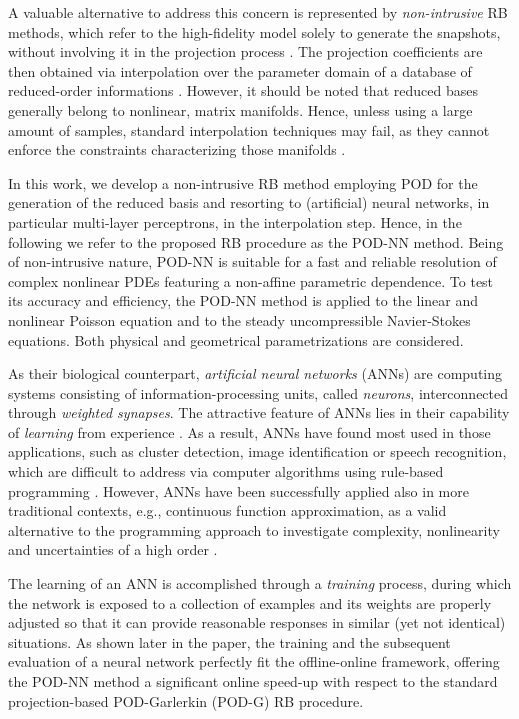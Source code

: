 \documentclass{elsarticle}
\theoremstyle{theorem}
\theoremstyle{definition}
\theoremstyle{remark}
\theoremstyle{proposition}
\numberwithin{figure}{section}
\begin{document}
		A valuable alternative to address this concern is represented by \emph{non-intrusive} RB methods, which refer to the high-fidelity model solely to generate the snapshots, without involving it in the projection process \cite{Chen17}. The projection coefficients are then obtained via interpolation over the parameter domain of a database of reduced-order informations \cite{Cas15}. However, it should be noted that reduced bases generally belong to nonlinear, matrix manifolds. Hence, unless using a large amount of samples, standard interpolation techniques may fail, as they cannot enforce the constraints characterizing those manifolds \cite{Ams10, BNR00}. 
		
		In this work, we develop a non-intrusive RB method employing POD for the generation of the reduced basis and resorting to (artificial) neural networks, in particular multi-layer perceptrons, in the interpolation step. Hence, in the following we refer to the proposed RB procedure as the POD-NN method. Being of non-intrusive nature, POD-NN is suitable for a fast and reliable resolution of complex nonlinear PDEs featuring a non-affine parametric dependence. To test its accuracy and efficiency, the POD-NN method is applied to the linear and nonlinear Poisson equation and to the steady uncompressible Navier-Stokes equations. Both physical and geometrical parametrizations are considered.
		
		As their biological counterpart, \emph{artificial neural networks} (ANNs) \cite{Hay05} are computing systems consisting of information-processing units, called \emph{neurons}, interconnected through \emph{weighted synapses}. The attractive feature of ANNs lies in their capability of \emph{learning} from experience \cite{Kri07}. As a result, ANNs have found most used in those applications, such as cluster detection, image identification or speech recognition, which are difficult to address via computer algorithms using rule-based programming \cite{Mat16}. However, ANNs have been successfully applied also in more traditional contexts, e.g., continuous function approximation, as a valid alternative to the programming approach to investigate complexity, nonlinearity and uncertainties of a high order \cite{Nie15}. 
		
		The learning of an ANN is accomplished through a \emph{training} process, during which the network is exposed to a collection of examples and its weights are properly adjusted so that it can provide reasonable responses in similar (yet not identical) situations. As shown later in the paper, the training and the subsequent evaluation of a neural network perfectly fit the offline-online framework, offering the POD-NN method a significant online speed-up with respect to the standard projection-based POD-Garlerkin (POD-G) RB procedure.
		
\end{document}

